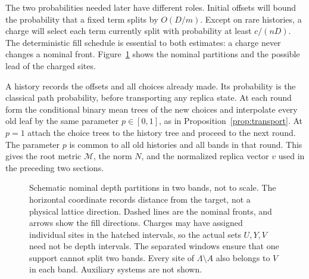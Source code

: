 The two probabilities needed later have different roles.  Initial offsets
will bound the probability that a fixed term splits by \(O(D/m)\).
Except on rare histories, a charge will select each term currently split
with probability at least \(c/(nD)\).  The deterministic fill schedule
is essential to both estimates: a charge never changes a nominal front.
Figure~\ref{scanner:figure} shows the nominal partitions and the possible
lead of the charged sites.

A history records the offsets and all choices already made.  Its
probability is the classical path probability, before transporting any
replica state.  At each round form the conditional binary mean trees
of the new choices and
interpolate every old leaf by the same parameter \(p\in[0,1]\), as in
Proposition~\ref{prop:transport}.  At \(p=1\) attach the choice trees
to the history tree and proceed to the next round.  The parameter \(p\)
is common to all old histories and all bands in that round.  This gives
the root metric \(\mathcal M\), the norm \(N\), and the normalized
replica vector \(v\) used in the preceding two sections.

\begin{figure}[H]
\centering
{}
\caption{Schematic nominal depth partitions in two bands, not to scale.
The horizontal coordinate records distance from the target, not a physical
lattice direction.  Dashed lines are the nominal fronts, and arrows show
the fill directions.  Charges may have assigned individual sites in the
hatched intervals, so the actual sets \(U,Y,V\) need not be depth
intervals.  The separated windows ensure that one support cannot split
two bands.  Every site of \(\Lambda\setminus A\) also belongs to \(V\)
in each band.  Auxiliary systems are not shown.}
\label{scanner:figure}
\end{figure}

